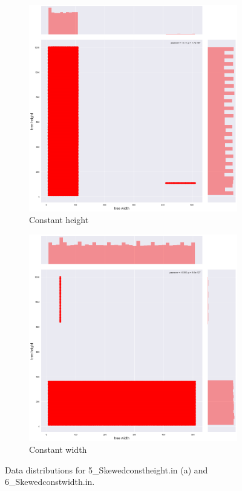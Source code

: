 \begin{figure}[H]
\centering
\begin{subfigure}{.5\textwidth}
  \centering
  \includegraphics[width=.8\linewidth]{img/5_SKEWEDCONSTHEIGHT_plot.png}
  \caption{Constant height}
  \label{fig:data:skewedconstheight}
\end{subfigure}%
\begin{subfigure}{.5\textwidth}
  \centering
  \includegraphics[width=.8\linewidth]{img/6_SKEWEDCONSTWIDTH_plot.png}
  \caption{Constant width}
  \label{fig:data:skewedconstwidth}
\end{subfigure}
\caption{Data distributions for 5\_Skewedconstheight.in (a) and 6\_Skewedconstwidth.in.}
\end{figure}

